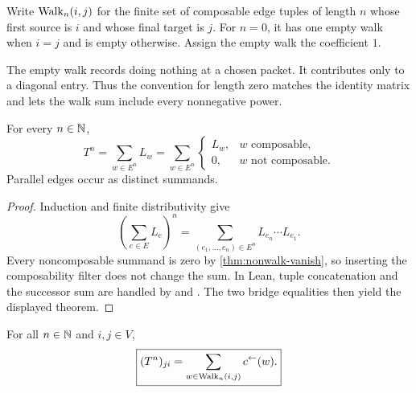 Write $\operatorname{Walk}_n(i,j)$ for the finite set of composable edge tuples of length $n$
whose first source is $i$ and whose final target is $j$. For $n=0$, it has
one empty walk when $i=j$ and is empty otherwise. Assign the empty walk the
coefficient $1$.

\begin{interpretation}[title={The empty walk}]
The empty walk records doing nothing at a chosen packet. It contributes only
to a diagonal entry. Thus the convention for length zero matches the identity
matrix and lets the walk sum include every nonnegative power.
\end{interpretation}

\begin{theorem}
\label{thm:word-to-walk}
For every $n\in\mathbb N$,
\[
  \boxed{
  T^n
  =
  \sum_{w\in E^n}L_w
  =
  \sum_{w\in E^n}
  \begin{cases}
  L_w,&w\text{ composable},\\
  0,&w\text{ not composable}.
  \end{cases}
  }
\]
Parallel edges occur as distinct summands.
\end{theorem}

\begin{proof}
Induction and finite distributivity give
\[
\left(\sum_{e\in E}L_e\right)^n
=
\sum_{(e_1,\ldots,e_n)\in E^n}L_{e_n}\cdots L_{e_1}.
\]
Every noncomposable summand is zero by
\cref{thm:nonwalk-vanish}, so inserting the composability filter does not
change the sum.  In Lean, tuple concatenation and the successor sum are
handled by  and
. The two bridge equalities then yield
the displayed theorem.
\end{proof}

\begin{corollary}
\label{cor:word-to-walk-entry}
For all $n\in\mathbb N$ and $i,j\in V$,
\[
  \boxed{
  (T^n)_{ji}
  =
  \sum_{w\in\operatorname{Walk}_n(i,j)}c^\leftarrow(w).
  }
\]
\end{corollary}

